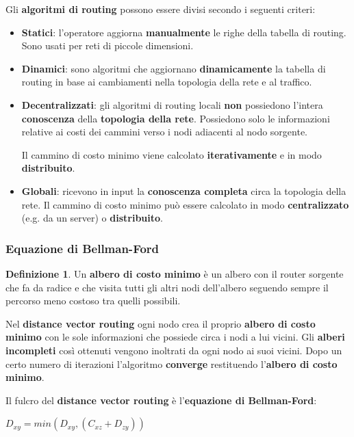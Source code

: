 \documentclass[11pt,a4paper,oneside]{book}
\theoremstyle{definition}
\newtheorem{definition}{Definizione}[section]
\begin{document}
Gli \textbf{algoritmi di routing} possono essere divisi secondo i seguenti criteri:
\begin{itemize}
	\item \textbf{Statici}: l'operatore aggiorna \textbf{manualmente} le righe della tabella di routing. Sono usati per reti di piccole dimensioni.
	\item \textbf{Dinamici}: sono algoritmi che aggiornano \textbf{dinamicamente} la tabella di routing in base ai cambiamenti nella topologia della rete e al traffico.
	\item \textbf{Decentralizzati}: gli algoritmi di routing locali \textbf{non} possiedono l'intera \textbf{conoscenza} della \textbf{topologia della rete}. Possiedono solo le informazioni relative ai costi dei cammini verso i nodi adiacenti al nodo sorgente.

	      \pagebreak

	      Il cammino di costo minimo viene calcolato \textbf{iterativamente} e in modo \textbf{distribuito}.
	\item \textbf{Globali}: ricevono in input la \textbf{conoscenza completa} circa la topologia della rete. Il cammino di costo minimo può essere calcolato in modo \textbf{centralizzato} (e.g. da un server) o \textbf{distribuito}.
\end{itemize}

\subsubsection{Equazione di Bellman-Ford}

\theoremstyle{definition}
\begin{definition}
	Un \textbf{albero di costo minimo} è un albero con il router sorgente che fa da radice e che visita tutti gli altri nodi dell'albero seguendo sempre il percorso meno costoso tra quelli possibili.
\end{definition}

Nel \textbf{distance vector routing} ogni nodo crea il proprio \textbf{albero di costo minimo} con le sole informazioni che possiede circa i nodi a lui vicini. Gli \textbf{alberi incompleti} così ottenuti vengono inoltrati da ogni nodo ai suoi vicini. Dopo un certo numero di iterazioni l'algoritmo \textbf{converge} restituendo l'\textbf{albero di costo minimo}.

Il fulcro del \textbf{distance vector routing} è l'\textbf{equazione di Bellman-Ford}:

{\centering $ \displaystyle D_{xy} =  min(D_{xy},(C_{xz} + D_{zy}))$ \par }
\end{document}
